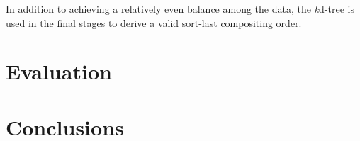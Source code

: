 In addition to achieving a relatively even balance among the data, the
\emph{k}d-tree is used in the final stages to derive a valid sort-last
compositing order.

\section{Evaluation}
\label{sec:eval}

\section{Conclusions}
\label{sec:conclusions}
